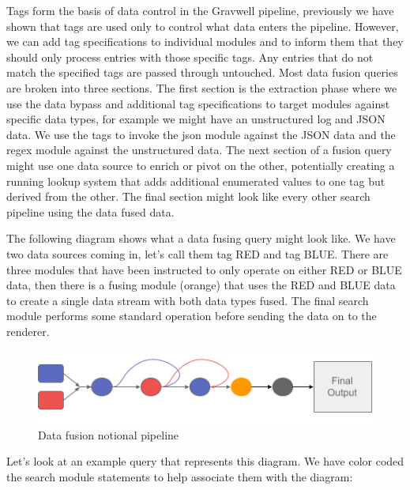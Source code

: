 Tags form the basis of data control in the Gravwell pipeline,
previously we have shown that tags are used
only to control what data enters the pipeline. However, we can add tag
specifications to individual modules and to inform them that they should
only process entries with those specific tags. Any entries that do not
match the specified tags are passed through untouched. Most data fusion
queries are broken into three sections. The first section is the
extraction phase where we use the data bypass and additional tag
specifications to target modules against specific data types, for
example we might have an unstructured log and JSON data. We use the
tags to invoke the json module against the JSON data and the regex
module against the unstructured data. The next section of a fusion query
might use one data source to enrich or pivot on the other, potentially
creating a running lookup system that adds additional enumerated values
to one tag but derived from the other. The final section might look
like every other search pipeline using the data fused data.

The following diagram shows what a data fusing query might look like.
We have two data sources coming in, let's call them tag RED and tag
BLUE. There are three modules that have been instructed to only
operate on either RED or BLUE data, then there is a fusing
module (orange) that uses the RED and BLUE data to create a
single data stream with both data types fused. The final search module
performs some standard operation before sending the data on to the
renderer.

\begin{figure}
	\includegraphics{images/data-fusion-pipeline.png}
	\caption{Data fusion notional pipeline}
	\label{fig:data-fusion-pipeline}
\end{figure}

Let's look at an example query that represents this diagram. We have
color coded the search module statements to help associate them with the
diagram:


